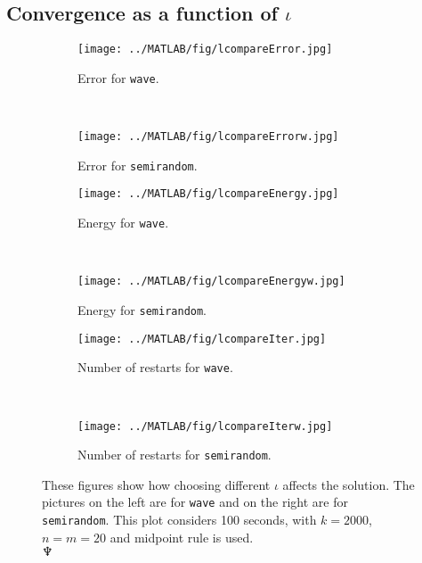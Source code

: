 \subsection{Convergence as a function of $\iota$}%
\begin{figure}[H]
        \centering
        \begin{subfigure}[b]{0.45\textwidth}
                \texttt{[image: ../MATLAB/fig/lcompareError.jpg]}
                \caption{ Error for \texttt{wave}. }
                \label{fig:lcompareError}
        \end{subfigure}
		~
		\begin{subfigure}[b]{0.45\textwidth}
                \texttt{[image: ../MATLAB/fig/lcompareErrorw.jpg]}
                \caption{ Error for \texttt{semirandom}. }
                \label{fig:lcompareErrorw}
        \end{subfigure}
        
                \begin{subfigure}[b]{0.45\textwidth}
                \texttt{[image: ../MATLAB/fig/lcompareEnergy.jpg]}
                \caption{ Energy for \texttt{wave}. }
                \label{fig:lcompareEnergy}
        \end{subfigure}
		~
		\begin{subfigure}[b]{0.45\textwidth}
                \texttt{[image: ../MATLAB/fig/lcompareEnergyw.jpg]}
                \caption{ Energy for \texttt{semirandom}. }
                \label{fig:lcompareEnergyw}
        \end{subfigure}
        
                \begin{subfigure}[b]{0.45\textwidth}
                \texttt{[image: ../MATLAB/fig/lcompareIter.jpg]}
                \caption{ Number of restarts for \texttt{wave}. }
                \label{fig:lcompareIter}
        \end{subfigure}
		~
		\begin{subfigure}[b]{0.45\textwidth}
                \texttt{[image: ../MATLAB/fig/lcompareIterw.jpg]}
                \caption{ Number of restarts for \texttt{semirandom}. }
                \label{fig:lcompareIterw}
        \end{subfigure}
        \caption{ These figures show how choosing different $\iota$ affects the solution. The pictures on the left are for \texttt{wave} and on the right are for \texttt{semirandom}. This plot considers 100 seconds, with $k = 2000$, $n = m = 20$ and midpoint rule is used. \\ $\neptune$  }
        \label{fig:lcompare}
\end{figure}
